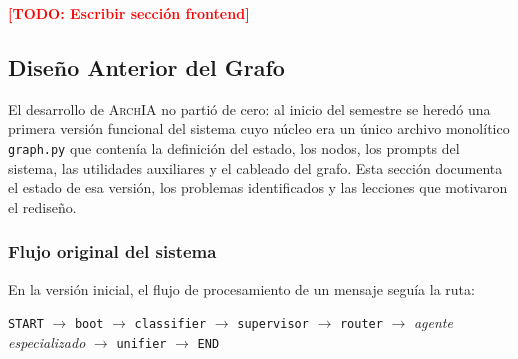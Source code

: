 \documentclass[12pt, letterpaper, oneside]{article}
\newcommand{\archia}{\textsc{ArchIA}}
\newcommand{\TODO}[1]{\textcolor{red}{\textbf{[TODO: #1]}}}
\begin{document}

\TODO{Escribir sección frontend}


\subsection{Diseño Anterior del Grafo}
\label{subsec:grafo-anterior}


El desarrollo de \archia{} no partió de cero: al inicio del semestre se heredó una
primera versión funcional del sistema cuyo núcleo era un único archivo monolítico
\texttt{graph.py} que contenía la definición del estado, los nodos, los prompts
del sistema, las utilidades auxiliares y el cableado del grafo. Esta sección
documenta el estado de esa versión, los problemas identificados y las lecciones
que motivaron el rediseño.

\subsubsection{Flujo original del sistema}

En la versión inicial, el flujo de procesamiento de un mensaje seguía la ruta:

\begin{center}
{
\fontsize{10}{11}\selectfont
\texttt{START} $\rightarrow$ \texttt{boot} $\rightarrow$ \texttt{classifier}
$\rightarrow$ \texttt{supervisor} $\rightarrow$ \texttt{router}
$\rightarrow$ \emph{agente especializado} $\rightarrow$ \texttt{unifier}
$\rightarrow$ \texttt{END}
}
\end{center}
\end{document}
